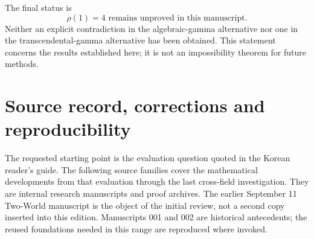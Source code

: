 \documentclass[11pt,a4paper]{article}
\theoremstyle{definition}
\theoremstyle{remark}
\theoremstyle{plain}
\numberwithin{equation}{section}
\begin{document}
The final status is
\[
 \boxed{\rho(1)=4\text{ remains unproved in this manuscript}.}
\]
Neither an explicit contradiction in the algebraic-gamma alternative nor
one in the transcendental-gamma alternative has been obtained. This
statement concerns the results established here; it is not an
impossibility theorem for future methods.

\section{Source record, corrections and reproducibility}
\label{int:sources}

The requested starting point is the evaluation question quoted in the
Korean reader's guide. The following source families cover the
mathematical developments from that evaluation through the last
cross-field investigation. They are internal research manuscripts and
proof archives. The earlier September 11 Two-World manuscript is the
object of the initial review, not a second copy inserted into this
edition. Manuscripts 001 and 002 are historical antecedents; the reused
foundations needed in this range are reproduced where invoked.
\end{document}
